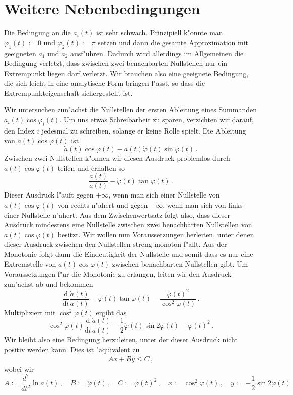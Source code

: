 \documentclass[a4paper]{scrartcl}
\newcommand{\de}{{\mathrm{d}}}
\newcommand{\pphi}{{\varphi}}
\begin{document}
\section{Weitere Nebenbedingungen} \label{sec:moreconds}

Die Bedingung an die $a_i(t)$ ist sehr schwach. Prinzipiell k"onnte man $\pphi_1(t):=0$ und $\pphi_2(t):=\pi$ setzen und dann die gesamte Approximation mit geeigneten $a_1$ und $a_2$ ausf"uhren. Dadurch wird allerdings im Allgemeinen die Bedingung verletzt, dass zwischen zwei benachbarten Nullstellen nur ein Extrempunkt liegen darf verletzt. Wir brauchen also eine geeignete Bedingung, die sich leicht in eine analytische Form bringen l"asst, so dass die Extrempunkteigenschaft sichergestellt ist. 

Wir untersuchen zun"achst die Nullstellen der ersten Ableitung eines Summanden $a_i(t)\cos\pphi_i(t)$. Um uns etwas Schreibarbeit zu sparen, verzichten wir darauf, den Index $i$ jedesmal zu schreiben, solange er keine Rolle spielt. Die Ableitung von $a(t)\cos\pphi(t)$ ist
$$ \dot a(t)\cos\pphi(t)-a(t)\dot\pphi(t)\sin\pphi(t)\,. $$
Zwischen zwei Nullstellen k"onnen wir diesen Ausdruck problemlos durch $a(t)\cos\pphi(t)$ teilen und erhalten so
$$ \frac{\dot a(t)}{a(t)}
-\dot\pphi(t)\tan\pphi(t)\,. $$
Dieser Ausdruck l"auft gegen $+\infty$, wenn man sich einer Nullstelle von $a(t)\cos\pphi(t)$ von rechts n"ahert und gegen $-\infty$, wenn man sich von links einer Nullstelle n"ahert. Aus dem Zwischenwertsatz folgt also, dass dieser Ausdruck mindestens eine Nullstelle zwischen zwei benachbarten Nullstellen von $a(t)\cos\pphi(t)$ besitzt. Wir wollen nun Voraussetzungen herleiten, unter denen dieser Ausdruck zwischen den Nullstellen streng monoton f"allt. Aus der Monotonie folgt dann die Eindeutigkeit der Nullstelle und somit dass es nur eine Extremstelle von $a(t)\cos\pphi(t)$ zwischen benachbarten Nullstellen gibt. Um Voraussetzungen f"ur die Monotonie zu erlangen, leiten wir den Ausdruck zun"achst ab und bekommen
$$ \frac{\de}{\de t}\frac{\dot a(t)}{a(t)}
-\ddot\pphi(t)\tan\pphi(t)
-\frac{\dot\pphi(t)^2}{\cos^2\pphi(t)}\,. $$
Multipliziert mit $\cos^2\pphi(t)$ ergibt das
$$ \cos^2\pphi(t)\frac{\de}{\de t}\frac{\dot a(t)}{a(t)}
-\frac12\ddot\pphi(t)\sin 2\pphi(t)
-\dot\pphi(t)^2\,. $$
Wir bleibt also eine Bedingung herzuleiten, unter der dieser Ausdruck nicht positiv werden kann. Dies ist "aquivalent zu
\begin{align} \label{eq:AxByC}
  Ax + By \le C\,,
\end{align}
wobei wir 
$$ 
A:=\frac{d^2}{dt^2}\ln a(t)\,, \quad
B:=\ddot\pphi(t)\,, \quad
C:=\dot\pphi(t)^2\,, \quad
x:=\cos^2\pphi(t)\,, \quad
y:=-\frac12\sin2\pphi(t) $$
\end{document}
